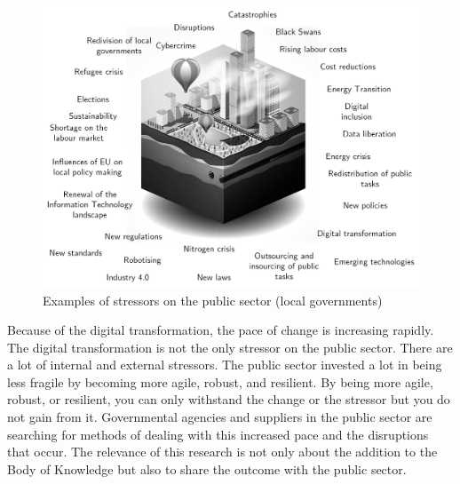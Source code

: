 \begin{figure}[H]
	\centering
	\includegraphics[width=0.8\linewidth]{images/publicstressors}
	\caption[Examples of stressors on the public sector (local governments)]{Examples of stressors on the public sector (local governments)}
	\label{fig:publicstressors}
\end{figure}

Because of the digital transformation, the pace of change is increasing rapidly.  The digital transformation is not the only stressor on the public sector. There are a lot of internal and external stressors. The public sector invested a lot in being less fragile by becoming more agile, robust, and resilient. By being more agile, robust, or resilient, you can only withstand the change or the stressor but you do not gain from it. Governmental agencies and suppliers in the public sector are searching for methods of dealing with this increased pace and the disruptions that occur. The relevance of this research is not only about the addition to the Body of Knowledge but also to share the outcome with the public sector.

